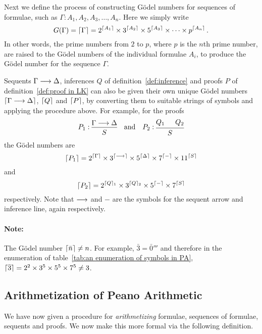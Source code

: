\documentclass[11pt,a4paper]{article}
\begin{document}
Next we define the process of constructing Gödel numbers for
sequences of formulae, such as \(\Gamma: A_1,A_2,A_3,\ldots,A_n\).
Here we simply write
\begin{equation*}
    G(\Gamma) = \lceil\Gamma\rceil =
    2^{\lceil A_1\rceil}\times3^{\lceil A_2\rceil}\times5^{\lceil A_3\rceil}\times\cdots\times p^{\lceil A_n\rceil} \,.
\end{equation*}
In other words, the prime numbers from \(2\) to \(p\),
where \(p\) is the \(n\)th prime number,
are raised to the Gödel numbers of the individual formulae \(A_i\),
to produce the Gödel number for the sequence \(\Gamma\).

Sequents \(\Gamma\longrightarrow\Delta\), inferences \(Q\) of definition~\ref{def:inference}
and proofs \(P\) of definition~\ref{def:proof in LK} can also be given
their own unique Gödel numbers \(\lceil\Gamma\longrightarrow\Delta\rceil\),
\(\lceil Q\rceil\) and \(\lceil P\rceil\), by converting them to suitable strings of symbols
and applying the procedure above. For example, for the proofs
\begin{equation*}
    P_1:
    \begin{prooftree}
        \hypo{\Gamma\seq\Delta}
        \infer1{S}
    \end{prooftree}
    \quad\text{and}\quad
    P_2:
    \begin{prooftree}
        \hypo{Q_1}
        \hypo{Q_2}
        \infer2{S}
    \end{prooftree}
\end{equation*}
the Gödel numbers are
\[
\lceil P_1\rceil = 2^{\lceil\Gamma\rceil}\times3^{\lceil\longrightarrow\rceil}\times5^{\lceil\Delta\rceil}\times7^{\lceil-\rceil}\times11^{\lceil S\rceil}
\] and
\[\lceil P_2\rceil = 2^{\lceil Q\rceil_1}\times3^{\lceil Q\rceil_2}\times5^{\lceil-\rceil}\times7^{\lceil S\rceil}\]
respectively. Note that \(\longrightarrow\) and \(-\) are the symbols for the sequent arrow
and inference line, again respectively.

\paragraph{Note:}
The Gödel number \(\lceil\bar n\rceil \neq n\).
For example, \(\bar3 = \bar0'''\)
and therefore in the enumeration of table~\ref{tab:an enumeration of symbols in PA},
\(\lceil\bar3\rceil = 2^2\times3^5\times5^5\times7^5\neq3\).

\subsection{Arithmetization of Peano Arithmetic}

We have now given a procedure for \emph{arithmetizing} formulae,
sequences of formulae, sequents and proofs. We now make this more
formal via the following definition.
\end{document}
